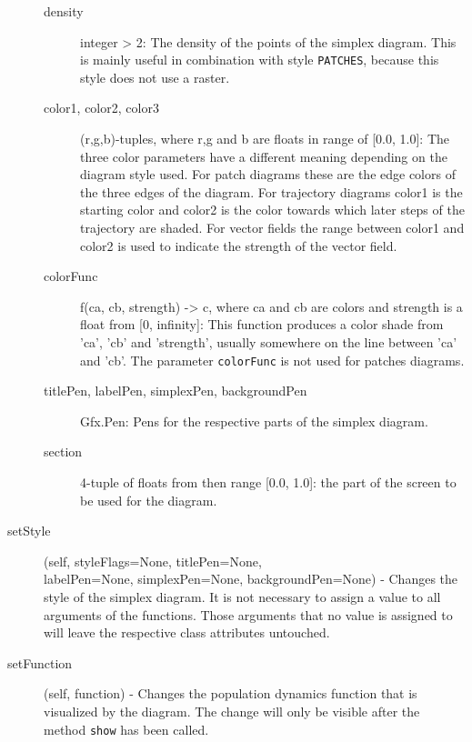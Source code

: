 \documentclass[12pt,a4paper,USenglish]{article}
\begin{document}
\begin{description}
\begin{description}
\item[density] integer > 2:  The density of the points of the simplex 
	diagram. This is mainly useful in combination with style {\tt PATCHES},
	because this style does not use a raster.

\item[color1, color2, color3] (r,g,b)-tuples, where r,g and b are
        floats in range of [0.0, 1.0]: The three color parameters have a
	different meaning depending on the diagram style used. 
	 For patch diagrams these
            are the edge colors of the three edges of the diagram. For
            trajectory diagrams color1 is the starting color and color2
            is the color towards which later steps of the trajectory are
            shaded. For vector fields the range between color1 and
            color2 is used to indicate the strength of the vector field. 

\item[colorFunc] f(ca, cb, strength) -> c, where ca and cb are colors
            and strength is a float from [0, infinity]: This function
            produces a color shade from 'ca', 'cb' and 'strength',
            usually somewhere on the line between 'ca' and 'cb'. The
            parameter {\tt colorFunc} is not used for patches diagrams.

\item[titlePen, labelPen, simplexPen, backgroundPen] Gfx.Pen: Pens
            for the respective parts of the simplex diagram.

\item[section] 4-tuple of floats from then range [0.0, 1.0]: the
            part of the screen to be used for the diagram. 

\end{description}

\item[setStyle](self, styleFlags=None, titlePen=None,\\
  labelPen=None, simplexPen=None, backgroundPen=None) - Changes the
  style of the simplex diagram. It is not necessary to assign a value
  to all arguments of the functions. Those arguments that no value is
  assigned to will leave the respective class attributes untouched.

\item[setFunction](self, function) - Changes the population dynamics
  function that is visualized by the diagram. The change will only be
  visible after the method {\tt show} has been called.


\end{description}
\end{document}
